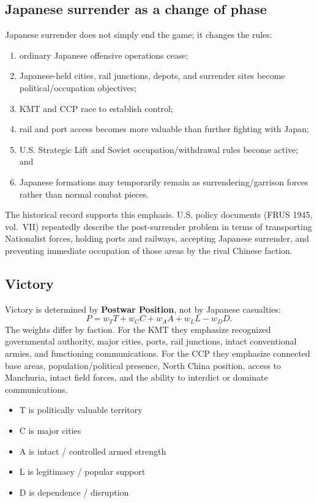 \documentclass[11pt]{article}
\begin{document}
\subsection{Japanese surrender as a change of phase}
Japanese surrender does not simply end the game; it changes the rules:
\begin{enumerate}
\item ordinary Japanese offensive operations cease;
\item Japanese-held cities, rail junctions, depots, and surrender sites become political/occupation objectives;
\item KMT and CCP race to establish control;
\item rail and port access becomes more valuable than further fighting with Japan;
\item U.S. Strategic Lift and Soviet occupation/withdrawal rules become active; and
\item Japanese formations may temporarily remain as surrendering/garrison forces rather than normal combat pieces.
\end{enumerate}

The historical record supports this emphasis. U.S. policy documents (FRUS 1945, vol.~VII) repeatedly describe the post-surrender problem in terms of transporting Nationalist forces, holding ports and railways, accepting Japanese surrender, and preventing immediate occupation of those areas by the rival Chinese faction.

\subsection{Victory}
Victory is determined by \textbf{Postwar Position}, not by Japanese casualties:
\[
P=w_T T+w_C C+w_A A+w_L L-w_D D.
\]
The weights differ by faction. For the KMT they emphasize recognized governmental authority, major cities, ports, rail junctions, intact conventional armies, and functioning communications. For the CCP they emphasize connected base areas, population/political presence, North China position, access to Manchuria, intact field forces, and the ability to interdict or dominate communications.


\begin{itemize}
\item T is politically valuable territory
\item C is major cities
\item A is intact / controlled armed strength
\item L is legitimacy / popular support
\item D is dependence / disruption 
\end{itemize}
\end{document}
